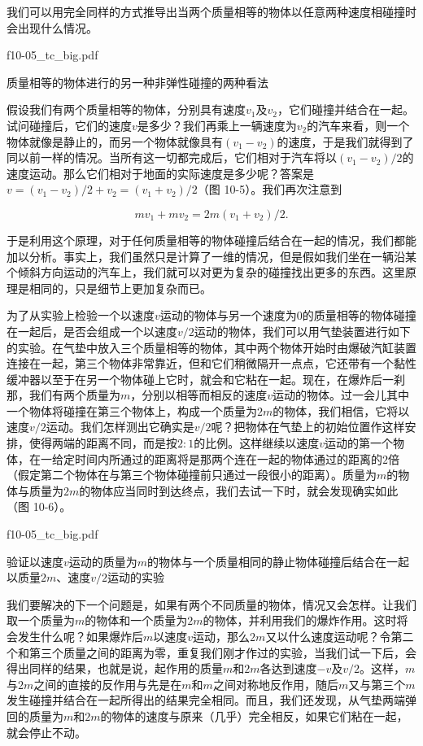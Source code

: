 \documentclass[12pt,oneside]{book}
\begin{document}
我们可以用完全同样的方式推导出当两个质量相等的物体以任意两种速度相碰撞时会出现什么情况。

\begin{fig}{f10-05_tc_big.pdf}
\caption{质量相等的物体进行的另一种非弹性碰撞的两种看法}
\label{fig:质量相等的物体进行的另一种非弹性碰撞的两种看法}
\end{fig}

假设我们有两个质量相等的物体，分别具有速度$v_1$及$v_2$，它们碰撞并结合在一起。试问碰撞后，它们的速度$v$是多少？我们再乘上一辆速度为$v_2$的汽车来看，则一个物体就像是静止的，而另一个物体就像具有$(v_1 - v_2)$的速度，于是我们就得到了同以前一样的情况。当所有这一切都完成后，它们相对于汽车将以$(v_1 - v_2)/2$的速度运动。那么它们相对于地面的实际速度是多少呢？答案是$v = (v_1 - v_2)/2 + v_2 = (v_1 + v_2)/2$（图 10-5）。我们再次注意到

\begin{equation}
\label{Eq:I:10:6}
mv_1+mv_2=2m(v_1+v_2)/2.
\end{equation}

于是利用这个原理，对于任何质量相等的物体碰撞后结合在一起的情况，我们都能加以分析。事实上，我们虽然只是计算了一维的情况，但是假如我们坐在一辆沿某个倾斜方向运动的汽车上，我们就可以对更为复杂的碰撞找出更多的东西。这里原理是相同的，只是细节上更加复杂而已。

为了从实验上检验一个以速度$v$运动的物体与另一个速度为$0$的质量相等的物体碰撞在一起后，是否会组成一个以速度$v/2$运动的物体，我们可以用气垫装置进行如下的实验。在气垫中放入三个质量相等的物体，其中两个物体开始时由爆破汽缸装置连接在一起，第三个物体非常靠近，但和它们稍微隔开一点点，它还带有一个黏性缓冲器以至于在另一个物体碰上它时，就会和它粘在一起。现在，在爆炸后一刹那，我们有两个质量为$m$，分别以相等而相反的速度$v$运动的物体。过一会儿其中一个物体将碰撞在第三个物体上，构成一个质量为$2m$的物体，我们相信，它将以速度$v/2$运动。我们怎样测出它确实是$v/2$呢？把物体在气垫上的初始位置作这样安排，使得两端的距离不同，而是按$2:1$的比例。这样继续以速度$v$运动的第一个物体，在一给定时间内所通过的距离将是那两个连在一起的物体通过的距离的$2$倍（假定第二个物体在与第三个物体碰撞前只通过一段很小的距离）。质量为$m$的物体与质量为$2m$的物体应当同时到达终点，我们去试一下时，就会发现确实如此（图 10-6）。

\begin{fig}{f10-05_tc_big.pdf}
\caption{验证以速度$v$运动的质量为$m$的物体与一个质量相同的静止物体碰撞后结合在一起以质量$2m$、速度$v/2$运动的实验}
\label{fig:图10-6}
\end{fig}


我们要解决的下一个问题是，如果有两个不同质量的物体，情况又会怎样。让我们取一个质量为$m$的物体和一个质量为$2m$的物体，并利用我们的爆炸作用。这时将会发生什么呢？如果爆炸后$m$以速度$v$运动，那么$2m$又以什么速度运动呢？令第二个和第三个质量之间的距离为零，重复我们刚才作过的实验，当我们试一下后，会得出同样的结果，也就是说，起作用的质量$m$和$2m$各达到速度$-v$及$v/2$。这样，$m$与$2m$之间的直接的反作用与先是在$m$和$m$之间对称地反作用，随后$m$又与第三个$m$发生碰撞并结合在一起所得出的结果完全相同。而且，我们还发现，从气垫两端弹回的质量为$m$和$2m$的物体的速度与原来（几乎）完全相反，如果它们粘在一起，就会停止不动。
\end{document}
